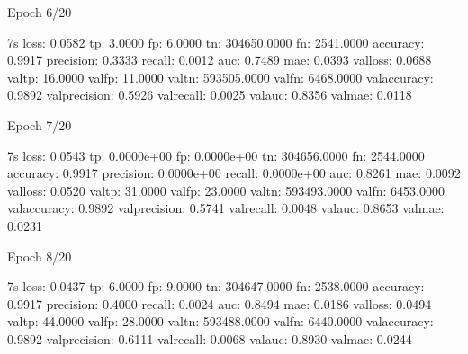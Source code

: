 \documentclass[letterpaper,10pt,english]{sphinxmanual}
\begin{document}
\begin{sphinxVerbatim}[commandchars=\\\{\}]
Epoch 6/20
\end{sphinxVerbatim}

\begin{sphinxVerbatim}[commandchars=\\\{\}]
 \PYGZhy{} 7s \PYGZhy{} loss: 0.0582 \PYGZhy{} tp: 3.0000 \PYGZhy{} fp: 6.0000 \PYGZhy{} tn: 304650.0000 \PYGZhy{} fn: 2541.0000 \PYGZhy{} accuracy: 0.9917 \PYGZhy{} precision: 0.3333 \PYGZhy{} recall: 0.0012 \PYGZhy{} auc: 0.7489 \PYGZhy{} mae: 0.0393 \PYGZhy{} val\PYGZus{}loss: 0.0688 \PYGZhy{} val\PYGZus{}tp: 16.0000 \PYGZhy{} val\PYGZus{}fp: 11.0000 \PYGZhy{} val\PYGZus{}tn: 593505.0000 \PYGZhy{} val\PYGZus{}fn: 6468.0000 \PYGZhy{} val\PYGZus{}accuracy: 0.9892 \PYGZhy{} val\PYGZus{}precision: 0.5926 \PYGZhy{} val\PYGZus{}recall: 0.0025 \PYGZhy{} val\PYGZus{}auc: 0.8356 \PYGZhy{} val\PYGZus{}mae: 0.0118
\end{sphinxVerbatim}

\begin{sphinxVerbatim}[commandchars=\\\{\}]
Epoch 7/20
\end{sphinxVerbatim}

\begin{sphinxVerbatim}[commandchars=\\\{\}]
 \PYGZhy{} 7s \PYGZhy{} loss: 0.0543 \PYGZhy{} tp: 0.0000e+00 \PYGZhy{} fp: 0.0000e+00 \PYGZhy{} tn: 304656.0000 \PYGZhy{} fn: 2544.0000 \PYGZhy{} accuracy: 0.9917 \PYGZhy{} precision: 0.0000e+00 \PYGZhy{} recall: 0.0000e+00 \PYGZhy{} auc: 0.8261 \PYGZhy{} mae: 0.0092 \PYGZhy{} val\PYGZus{}loss: 0.0520 \PYGZhy{} val\PYGZus{}tp: 31.0000 \PYGZhy{} val\PYGZus{}fp: 23.0000 \PYGZhy{} val\PYGZus{}tn: 593493.0000 \PYGZhy{} val\PYGZus{}fn: 6453.0000 \PYGZhy{} val\PYGZus{}accuracy: 0.9892 \PYGZhy{} val\PYGZus{}precision: 0.5741 \PYGZhy{} val\PYGZus{}recall: 0.0048 \PYGZhy{} val\PYGZus{}auc: 0.8653 \PYGZhy{} val\PYGZus{}mae: 0.0231
\end{sphinxVerbatim}

\begin{sphinxVerbatim}[commandchars=\\\{\}]
Epoch 8/20
\end{sphinxVerbatim}

\begin{sphinxVerbatim}[commandchars=\\\{\}]
 \PYGZhy{} 7s \PYGZhy{} loss: 0.0437 \PYGZhy{} tp: 6.0000 \PYGZhy{} fp: 9.0000 \PYGZhy{} tn: 304647.0000 \PYGZhy{} fn: 2538.0000 \PYGZhy{} accuracy: 0.9917 \PYGZhy{} precision: 0.4000 \PYGZhy{} recall: 0.0024 \PYGZhy{} auc: 0.8494 \PYGZhy{} mae: 0.0186 \PYGZhy{} val\PYGZus{}loss: 0.0494 \PYGZhy{} val\PYGZus{}tp: 44.0000 \PYGZhy{} val\PYGZus{}fp: 28.0000 \PYGZhy{} val\PYGZus{}tn: 593488.0000 \PYGZhy{} val\PYGZus{}fn: 6440.0000 \PYGZhy{} val\PYGZus{}accuracy: 0.9892 \PYGZhy{} val\PYGZus{}precision: 0.6111 \PYGZhy{} val\PYGZus{}recall: 0.0068 \PYGZhy{} val\PYGZus{}auc: 0.8930 \PYGZhy{} val\PYGZus{}mae: 0.0244
\end{sphinxVerbatim}
\end{document}
